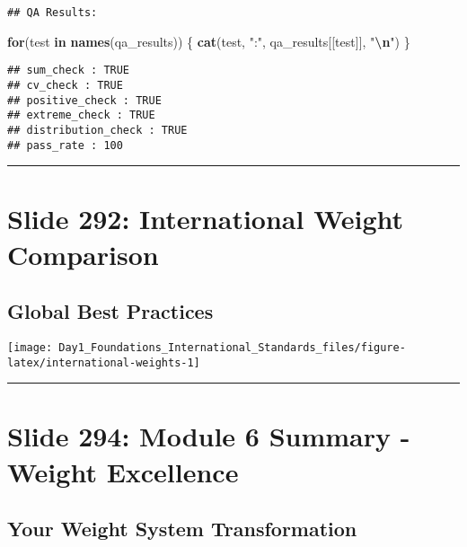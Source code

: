 \documentclass[
]{article}
\newenvironment{Shaded}{\begin{snugshade}}{\end{snugshade}}
\newcommand{\ControlFlowTok}[1]{\textcolor[rgb]{0.13,0.29,0.53}{\textbf{#1}}}
\newcommand{\FunctionTok}[1]{\textcolor[rgb]{0.13,0.29,0.53}{\textbf{#1}}}
\newcommand{\NormalTok}[1]{#1}
\newcommand{\SpecialCharTok}[1]{\textcolor[rgb]{0.81,0.36,0.00}{\textbf{#1}}}
\newcommand{\StringTok}[1]{\textcolor[rgb]{0.31,0.60,0.02}{#1}}
\begin{document}
\begin{verbatim}
## QA Results:
\end{verbatim}

\begin{Shaded}
\begin{Highlighting}[]
\ControlFlowTok{for}\NormalTok{(test }\ControlFlowTok{in} \FunctionTok{names}\NormalTok{(qa\_results)) \{}
  \FunctionTok{cat}\NormalTok{(test, }\StringTok{":"}\NormalTok{, qa\_results[[test]], }\StringTok{"}\SpecialCharTok{\textbackslash{}n}\StringTok{"}\NormalTok{)}
\NormalTok{\}}
\end{Highlighting}
\end{Shaded}

\begin{verbatim}
## sum_check : TRUE 
## cv_check : TRUE 
## positive_check : TRUE 
## extreme_check : TRUE 
## distribution_check : TRUE 
## pass_rate : 100
\end{verbatim}

\begin{center}\rule{0.5\linewidth}{0.5pt}\end{center}

\section{Slide 292: International Weight
Comparison}\label{slide-292-international-weight-comparison}

\subsection{Global Best Practices}\label{global-best-practices}

\texttt{[image: Day1\_Foundations\_International\_Standards\_files/figure-latex/international-weights-1]}

\begin{center}\rule{0.5\linewidth}{0.5pt}\end{center}

\section{Slide 294: Module 6 Summary - Weight
Excellence}\label{slide-294-module-6-summary---weight-excellence}

\subsection{Your Weight System
Transformation}\label{your-weight-system-transformation}
\end{document}
